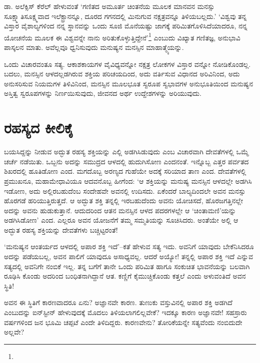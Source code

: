 ಡಾ. ಅಲೆಕ್ಸಿಸ್ ಕೆರೆಲ್​ ಹೇಳುವಂತೆ ‘ಗಣಿತದ ಅಮೂರ್ತ ಚಿಂತನೆಯ ಮೂಲಕ ಮಾನವನ ಮನಸ್ಸು ಸೂಕ್ಷ್ಮಾತಿಸೂಕ್ಷ್ಮವಾದ ಇಲೆಕ್ಟ್ರಾನನ್ನೂ, ದೂರದ ಗಗನದಲ್ಲಿ ಮಿನುಗುವ ನಕ್ಷತ್ರವನ್ನೂ ತಿಳಿಯಬಲ್ಲದು.’ ‘ವಿಶ್ವವು ತನ್ನ ವಿಸ್ತಾರ ವೈಶಾಲ್ಯಗಳಿಂದ ನನ್ನ ಸ್ಥಾನವನ್ನು ಒಂದು ಸೂಜಿ ಮೊನೆಯಷ್ಟು ಜಾಗಕ್ಕೆ ಪರಿಮಿತಗೊಳಿಸಿದೆಯಾದರೂ, ನನ್ನ ಯೋಚನೆಯ ಮೂಲಕ ಈ ವಿಶ್ವವನ್ನೇ ನಾನು ಅರಿತುಕೊಳ್ಳುತ್ತಿದ್ದೇನೆ’\footnote{\hfill{}} ಎಂಬುದು ವಿಖ್ಯಾತ ಗಣಿತಜ್ಞ, ಅನುಭಾವಿ ಪಾಸ್ಕಲನ ಮಾತು. ಅವೆಲ್ಲವೂ ಧ್ವನಿಸುವುದು ಮನುಷ್ಯನ ಮನಸ್ಸಿನ ಮಾಹಾತ್ಮ್ಯೆಯನ್ನು.

ಒಂದು ವಿಚಾರವಂತೂ ಸತ್ಯ. ಆಕಾಶಕಾಯಗಳ ವೈವಿಧ್ಯವನ್ನೋ ನಕ್ಷತ್ರ ಲೋಕಗಳ ವಿಸ್ತಾರ ವನ್ನೋ ನೋಡಿಕೊಂಡಲ್ಲ. ಬದಲು, ಮನಸ್ಸಿನ ಆಳದಲ್ಲಡಗಿರುವ ಶಕ್ತಿಯ ಪರಿಚಯದಿಂದ, ಅದು ವರ್ತಿಸುವ ವಿಧಾನದ ಅರಿವಿನಿಂದ, ಅದು ಅನುಸರಿಸುವ ನಿಯಮಗಳ ತಿಳಿವಿನಿಂದ, ಮನಸ್ಸಿನ ಮೂಲಭೂತ ಸ್ವರೂಪ ಸ್ವಭಾವಗಳ ಅನುಭೂತಿಯಿಂದ ಮನುಷ್ಯನ ಅಸ್ತಿತ್ವ ಸ್ವರೂಪಗಳನ್ನು ನಿರ್ಣಯಿಸುವುದು, ಜೀವನದ ಅರ್ಥ ಉದ್ದೇಶಗಳನ್ನು ಅರಿಯುವುದು.


\section*{ರಹಸ್ಯದ ಕೀಲಿಕೈ}


ಬಯಸಿದ್ದನ್ನು ನೀಡುವ ಅದ್ಭುತ ರಹಸ್ಯ ಶಕ್ತಿಯನ್ನು ಎಲ್ಲಿ ಅಡಗಿಸಿಡುವುದು ಎಂಬ ವಿಚಾರವಾಗಿ ದೇವತೆಗಳಲ್ಲಿ ಒಮ್ಮೆ ಚರ್ಚೆ ನಡೆಯಿತು. ಒಬ್ಬನು ಅದನ್ನು ಸಮುದ್ರದ ಆಳದಲ್ಲಿ ಹುದುಗಿಸೋಣ ಎಂದನಂತೆ. ಇನ್ನೊಬ್ಬ ಎತ್ತರ ಪರ್ವತದ ಶಿಖರದಲ್ಲಿ ಹೂತಿಡೋಣ ಎಂದ. ಮಗದೊಬ್ಬ ಅರಣ್ಯದ ಗುಹೆಯೇ ಅದಕ್ಕೆ ಸರಿಯಾದ ತಾಣ ಎಂದ. ದೇವತೆಗಳಲ್ಲಿ ಪ್ರಮುಖನೂ, ಮಹಾಮೇಧಾವಿಯೂ ಆದವನೊಬ್ಬ ಹೀಗೆಂದ: ‘ಆ ಶಕ್ತಿಯನ್ನು ಮನುಷ್ಯ ಮನಸ್ಸಿನ ಆಳದಲ್ಲೇ ಅಡಗಿಸಿ ಇಡೋಣ, ಅದು ಅಲ್ಲಿರಬಹುದೆಂಬ ಸಂದೇಹವೇ ಅವನಲ್ಲಿ ಉದಿಸದು. ಏಕೆಂದರೆ ಬಾಲ್ಯದಿಂದಲೇ ಅವನ ಮನಸ್ಸು ಹೊರಗಡೆ ಹರಿಯುತ್ತಿರುತ್ತದೆ. ಆ ಅದ್ಭುತ ಶಕ್ತಿ ತನ್ನಲ್ಲಿ ಇರಬಹುದೆಂದು ಅವನು ಯೋಚಿಸದೆ, ಹೊರಜಗತ್ತಿನಲ್ಲೇ ಅದನ್ನು ಅವನು ಹುಡುಕುತ್ತಾನೆ. ಆದುದರಿಂದ ಆತನ ಮನಸ್ಸಿನ ಆಳದ ಪದರಗಳಲ್ಲೇ ಆ ‘ಚಿಂತಾಮಣಿ’ಯನ್ನು ಅಡಗಿಸಿಡೋಣ’ ಎಂದ. ಎಲ್ಲರೂ ಅವನ ಯೋಜನೆಗೆ ತಮ್ಮ ಸಮ್ಮತಿಯನ್ನು ಸೂಚಿಸಿದರು. ಅಂತೆಯೇ ಅಲ್ಲಿ ಆ ಅದ್ಭುತ ರಹಸ್ಯ ಶಕ್ತಿಯನ್ನು ದೇವತೆಗಳು ಬಚ್ಚಿಟ್ಟರಂತೆ!

‘ಮನುಷ್ಯನ ಆಂತರ್ಯದ ಆಳದಲ್ಲಿ ಅಪಾರ ಶಕ್ತಿ ಇದೆ’–ಕತೆ ಹೇಳುವ ಸತ್ಯ ಇದು. ಅವನಿಗೆ ಯಾವುದು ಬೇಕೆನಿಸಿದರೂ ಅದನ್ನು ಪಡೆಯಬಲ್ಲ, ಅವನ ಪಾಲಿಗೆ ಯಾವುದೂ ಅಸಾಧ್ಯವಲ್ಲ. ಆದರೆ ಅಯ್ಯೋ! ತನ್ನಲ್ಲಿ ಅಪಾರ ಶಕ್ತಿ ಇದೆ ಎನ್ನುವ ಸತ್ಯದಲ್ಲಿ ಅವನಿಗೇ ನಂಬಿಕೆ ಇಲ್ಲ. ತನ್ನ ಬಗೆಗೆ ತಾನೇ ಒಂದು ಪರಿಮಿತ ಹಾಗೂ ಸಂಕುಚಿತ ಭಾವನೆಯನ್ನು ಬಲವಾಗಿ ರೂಢಿಸಿ ಕೊಂಡು ಅದರಿಂದ ಬಂಧಿತನಾಗಿದ್ದಾನೆ ಆತ. ಕಣ್ಣಿಗೆ ಕೈಮುಚ್ಚಿಕೊಂಡು ಕತ್ತಲೆ ಎಂದು ಅಳುವಂತಿದೆ ಅವನ ಸ್ಥಿತಿ!

ಅವನ ಈ ಸ್ಥಿತಿಗೆ ಕಾರಣವಾದರೂ ಏನು? ಅಜ್ಞಾನವೇ ಕಾರಣ. ತುಣುಕು ವಸ್ತುವಿನಲ್ಲಿ ಅಪಾರ ಶಕ್ತಿ ಅಡಗಿದೆ ಎಂಬುದನ್ನು ಐನ್​ಸ್ಟೀನ್ ಹೇಳುವುದಕ್ಕೆ ಮೊದಲು ತಿಳಿಯಲಾಗಲಿಲ್ಲವೇಕೆ? ಇದಕ್ಕೂ ಕಾರಣ ಅಜ್ಞಾನವೇ! ಸಹಸ್ರಾರು ವರ್ಷಗಳಿಂದ ಜನ ಭೂಮಿ ಚಪ್ಪಟೆ ಎಂದೇ ತಿಳಿದಿದ್ದರು. ಕಾರಣವೇನು? ತೋರಿಕೆಯನ್ನೇ ಸತ್ಯವೆಂದು ನಂಬಿದುದೇ ಅಲ್ಲವೇ?

